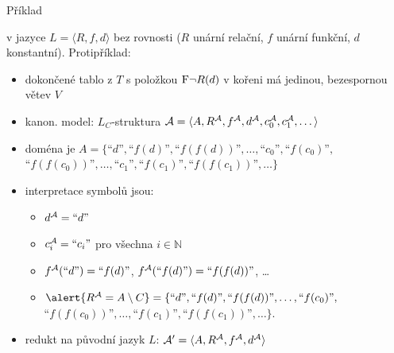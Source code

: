 \documentclass{beamer}
\begin{document}
\begin{frame}{Příklad}

    \pause
     v jazyce $L=\langle R,f,d \rangle$ bez rovnosti ($R$ unární relační, $f$ unární funkční, $d$ konstantní). Protipříklad: 

    \pause
    \begin{itemize}
        \item dokončené tablo z $T$ s položkou $\mathrm{F}\neg R(d)$ v kořeni má jedinou, bezespornou větev $V$\pause
        \item \alert{kanon. model:} $L_C$-struktura {$\mathcal{A}=\langle A,R^{\mathcal{A}},f^{\mathcal{A}},d^{\mathcal{A}},c_0^{\mathcal{A}},c_1^{\mathcal{A}},\dots\rangle$}\pause
        \item doména je {$A=\{\text{``$d$''},\text{``$f(d)$''},\text{``$f(f(d))$''},\dots,\text{``$c_0$''},\text{``$f(c_0)$''},$ $\text{``$f(f(c_0))$''},\dots,\text{``$c_1$''},\text{``$f(c_1)$''},\text{``$f(f(c_1))$''},\dots\}$}\pause
        \item interpretace symbolů jsou:\pause
        \begin{itemize}
            \item $d^{\mathcal{A}}=\text{``$d$''}$\pause
            \item $c^{\mathcal{A}}_i=\text{``$c_i$''}$ pro všechna $i\in \mathbb N$\pause
            \item $f^{\mathcal{A}}(\text{``$d$''})=\text{``$f(d)$''}$, $f^{\mathcal{A}}(\text{``$f(d)$''})=\text{``$f(f(d))$''}$, \dots\pause
            \item $\alert{R^\A=A\setminus C}=\{\text{``$d$''},\text{``$f(d)$''},\text{``$f(f(d))$''},\dots,\text{``$f(c_0)$''},$ $\text{``$f(f(c_0))$''},\dots,\text{``$f(c_1)$''},\text{``$f(f(c_1))$''},\dots\}$.\pause
        \end{itemize}
        \item redukt na původní jazyk $L$: $\mathcal{A}'=\langle A, R^{\mathcal{A}}, f^{\mathcal{A}}, d^{\mathcal{A}}\rangle$
    \end{itemize}
        
\end{frame}
\end{document}
